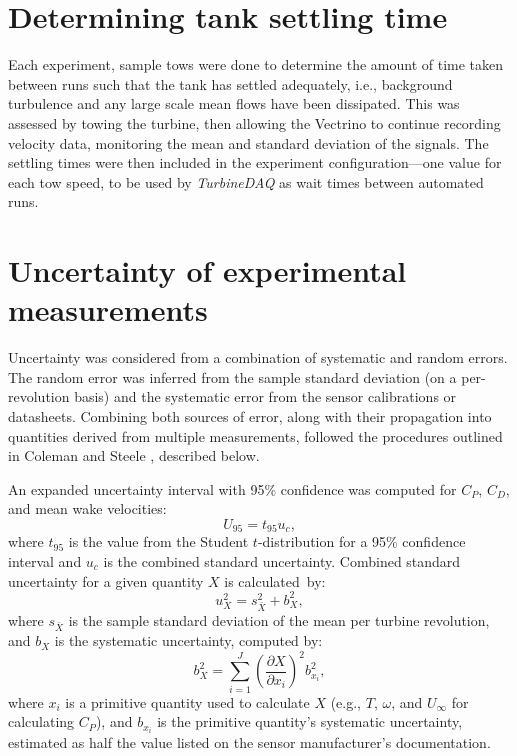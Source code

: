\section{Determining tank settling time}

Each experiment, sample tows were done to determine the amount of time taken
between runs such that the tank has settled adequately, i.e., background
turbulence and any large scale mean flows have been dissipated. This was
assessed by towing the turbine, then allowing the Vectrino to continue recording
velocity data, monitoring the mean and standard deviation of the signals. The
settling times were then included in the experiment configuration---one value
for each tow speed, to be used by \textit{TurbineDAQ} as wait times between
automated runs.


\section{Uncertainty of experimental measurements}




Uncertainty was considered from a combination of systematic and random errors.
The random error was inferred from the sample standard deviation (on a
per-revolution basis) and the systematic error from the sensor calibrations or
datasheets. Combining both sources of error, along with their propagation into
quantities derived from multiple measurements, followed the procedures outlined
in Coleman and Steele \cite{ColemanSteele}, described below.

An expanded uncertainty interval with 95\% confidence was computed for
$C_P$, $C_D$, and mean wake velocities:
\begin{equation}
U_{95} = t_{95} u_c,
\end{equation}
where $t_{95}$ is the value from the Student $t$-distribution for a 95\%
confidence interval and $u_c$ is the combined standard uncertainty. Combined
standard uncertainty for a given quantity $X$ is calculated~by:
\begin{equation}
u_X^2 = s_{\bar{X}}^2 + b_X^2,
\end{equation}
where $s_{\bar{X}}$ is the sample standard deviation of the mean per turbine
revolution, and $b_X$ is the systematic uncertainty, computed by:
\begin{equation}
b_{X}^2 = \sum_{i=1}^J \left( \frac{\partial X}{\partial x_i} \right)^2
b_{x_i}^2,
\end{equation}
where $x_i$ is a primitive quantity used to calculate $X$ (e.g., $T$, $\omega$,
and $U_\infty$ for calculating $C_P$), and $b_{x_i}$ is the primitive quantity's
systematic uncertainty, estimated as half the value listed on the sensor
manufacturer's documentation.

